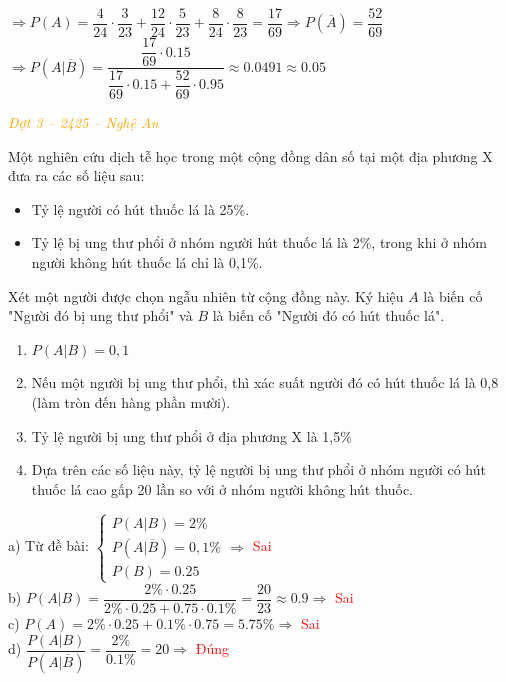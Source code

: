 \documentclass[twoside,final]{hcmut-report}
\newcommand{\exercise}[1]{\begin{exercisebox}#1\end{exercisebox}}
\begin{document}
$\Rightarrow P(A) = \dfrac{4}{24}\cdot\dfrac{3}{23} + \dfrac{12}{24}\cdot\dfrac{5}{23} + \dfrac{8}{24}\cdot\dfrac{8}{23} = \dfrac{17}{69} \Rightarrow P(\overline{A}) = \dfrac{52}{69}$\\
$\Rightarrow P(A|\overline{B}) = \dfrac{\dfrac{17}{69}\cdot 0.15}{\dfrac{17}{69}\cdot 0.15 + \dfrac{52}{69}\cdot0.95} \approx 0.0491 \approx 0.05$

\exercise{\textcolor{orange}{\textit{Đợt 3 -- 2425 -- Nghệ An}}

    Một nghiên cứu dịch tễ học trong một cộng đồng dân số tại một địa phương X đưa ra các số liệu sau:
    \begin{itemize}[itemsep=0pt, topsep=0pt, parsep=0pt,label=-]
        \item Tỷ lệ người có hút thuốc lá là 25\%.
        \item Tỷ lệ bị ung thư phổi ở nhóm người hút thuốc lá là 2\%, trong khi ở nhóm người không hút thuốc lá chỉ là 0,1\%.
    \end{itemize}

    Xét một người được chọn ngẫu nhiên từ cộng đồng này. Ký hiệu $A$ là biến cố "Người đó bị ung thư phổi" và $B$ là biến cố "Người đó có hút thuốc lá".
    \begin{enumerate}[itemsep=0pt, topsep=0pt, parsep=0pt,label=\alph*)]
        \item $P(A|B) = 0,1$
        \item Nếu một người bị ung thư phổi, thì xác suất người đó có hút thuốc lá là 0,8 (làm tròn đến hàng phần mười).
        \item Tỷ lệ người bị ung thư phổi ở địa phương X là 1,5\%
        \item Dựa trên các số liệu này, tỷ lệ người bị ung thư phổi ở nhóm người có hút thuốc lá cao gấp 20 lần so với ở nhóm người không hút thuốc.
    \end{enumerate}}
\begin{minipage}{0.55\textwidth}
    a) Từ đề bài: $\begin{cases}
            P(A|B)=2\%                \\
            P(A|\overline{B}) = 0,1\% \\
            P(B) = 0.25
        \end{cases} \Rightarrow$ \textcolor{red}{Sai}\\

    b) $P(A|B) = \dfrac{2\%\cdot 0.25}{2\%\cdot 0.25 + 0.75\cdot 0.1\%} = \dfrac{20}{23} \approx 0.9 \Rightarrow$ \textcolor{red}{Sai}\\

    c) $P(A) = 2\%\cdot 0.25 + 0.1\%\cdot 0.75 = 5.75\%\Rightarrow$ \textcolor{red}{Sai}\\

    d) $\dfrac{P(A|B)}{P(A|\overline{B})} = \dfrac{2\%}{0.1\%} = 20\Rightarrow$  \textcolor{red}{Đúng}
\end{minipage}
\end{document}

